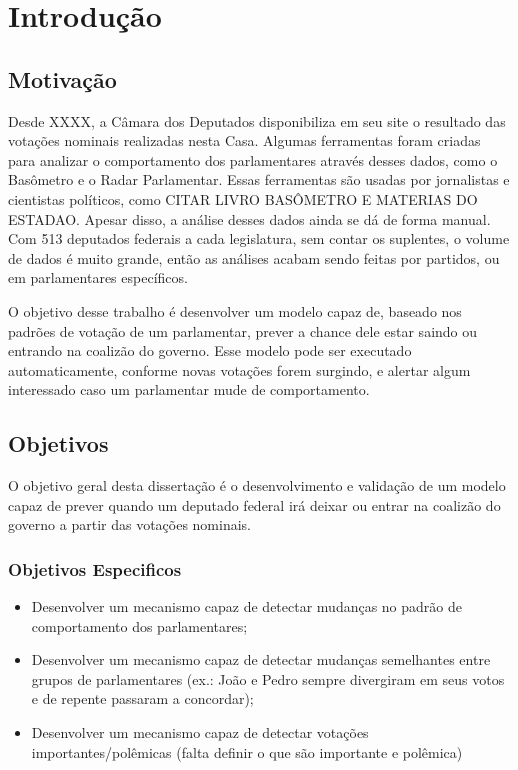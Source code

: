 \chapter{Introdução} \label{intro}

\section{Motivação}\label{sec:motivacao}

Desde XXXX, a Câmara dos Deputados disponibiliza em seu site o resultado das
votações nominais realizadas nesta Casa. Algumas ferramentas foram criadas para
analizar o comportamento dos parlamentares através desses dados, como o
Basômetro e o Radar Parlamentar. Essas ferramentas são usadas por jornalistas e
cientistas políticos, como CITAR LIVRO BASÔMETRO E MATERIAS DO ESTADAO. Apesar
disso, a análise desses dados ainda se dá de forma manual. Com 513 deputados
federais a cada legislatura, sem contar os suplentes, o volume de dados é muito
grande, então as análises acabam sendo feitas por partidos, ou em parlamentares
específicos.

O objetivo desse trabalho é desenvolver um modelo capaz de, baseado nos padrões
de votação de um parlamentar, prever a chance dele estar saindo ou entrando na
coalizão do governo. Esse modelo pode ser executado automaticamente, conforme
novas votações forem surgindo, e alertar algum interessado caso um parlamentar
mude de comportamento.

\section{Objetivos}

O objetivo geral desta dissertação é o desenvolvimento e validação de um modelo
capaz de prever quando um deputado federal irá deixar ou entrar na coalizão do
governo a partir das votações nominais.

\subsection{Objetivos Especificos}

\begin{itemize}
\item Desenvolver um mecanismo capaz de detectar mudanças no padrão de comportamento dos parlamentares;
\item Desenvolver um mecanismo capaz de detectar mudanças semelhantes entre grupos de parlamentares (ex.: João e Pedro sempre divergiram em seus votos e de repente passaram a concordar);
\item Desenvolver um mecanismo capaz de detectar votações importantes/polêmicas (falta definir o que são importante e polêmica)
\end{itemize}

